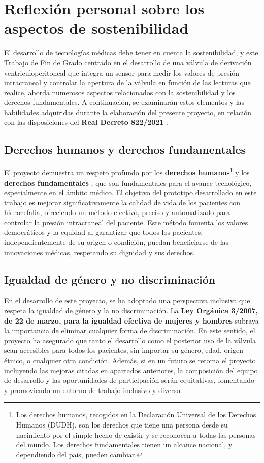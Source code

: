 
\section{Reflexión personal sobre los aspectos de sostenibilidad}

El desarrollo de tecnologías médicas debe tener en cuenta la sostenibilidad, y este Trabajo de Fin de Grado centrado en el desarrollo de una válvula de derivación ventriculoperitoneal que integra un sensor para medir los valores de presión intracraneal y controlar la apertura de la válvula en función de las lecturas que realice, aborda numerosos aspectos relacionados con la sostenibilidad y los derechos fundamentales. A continuación, se examinarán estos elementos y las habilidades adquiridas durante la elaboración del presente proyecto, en relación con las disposiciones del \textbf{Real Decreto 822/2021} \cite{anexoH-realdecre}.

\subsection{Derechos humanos y derechos fundamentales}
El proyecto demuestra un respeto profundo por los \textbf{derechos humanos}\footnote{Los derechos humanos, recogidos en la Declaración Universal de los Derechos Humanos (DUDH), son los derechos que tiene una persona desde su nacimiento por el simple hecho de existir y se reconocen a todas las personas del mundo. Los derechos fundamentales tienen un alcance nacional, y dependiendo del país, pueden cambiar.} \cite{dere-hum} y los \textbf{derechos fundamentales} \cite{dere-funda}, que son fundamentales para el avance tecnológico, especialmente en el ámbito médico. El objetivo del prototipo desarrollado en este trabajo es mejorar significativamente la calidad de vida de los pacientes con hidrocefalia, ofreciendo un método efectivo, preciso y automatizado para controlar la presión intracraneal del paciente. Este método fomenta los valores democráticos y la equidad al garantizar que todos los pacientes, independientemente de su origen o condición, puedan beneficiarse de las innovaciones médicas, respetando su dignidad y sus derechos.
    
\subsection{Igualdad de género y no discriminación}
En el desarrollo de este proyecto, se ha adoptado una perspectiva inclusiva que respeta la igualdad de género y la no discriminación. La \textbf{Ley Orgánica 3/2007, de 22 de marzo, para la igualdad efectiva de mujeres y hombres} \cite{ley-igualdad} subraya la importancia de eliminar cualquier forma de discriminación. En este sentido, el proyecto ha asegurado que tanto el desarrollo como el posterior uso de la válvula sean accesibles para todos los pacientes, sin importar su género, edad, origen étnico, o cualquier otra condición. Además, si en un futuro se retoma el proyecto incluyendo las mejoras citadas en apartados anteriores, la composición del equipo de desarrollo y las oportunidades de participación serán equitativas, fomentando y promoviendo un entorno de trabajo inclusivo y diverso.

